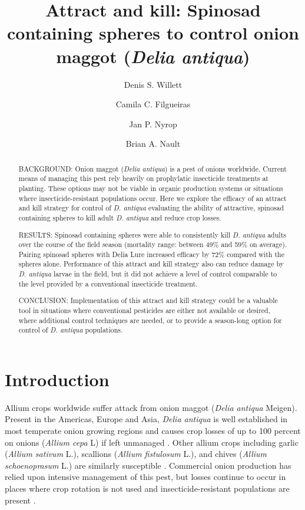 \documentclass[alpha-refs]{wiley-article}
\title{Attract and kill: Spinosad containing spheres to control onion maggot (\textit{Delia antiqua})}
\author[1\authfn{1}]{Denis S. Willett}
\author[1\authfn{1}]{Camila C. Filgueiras}
\author[1]{Jan P. Nyrop}
\author[1]{Brian A. Nault}
\affil[1]{Department of Entomology, Cornell AgriTech, Cornell University, Geneva, NY, 14456, USA}
\begin{document}
\maketitle

\begin{abstract}

BACKGROUND: Onion maggot (\textit{Delia antiqua}) is a pest of onions worldwide. Current means of managing this pest rely heavily on prophylatic insecticide treatments at planting. These options may not be viable in organic production systems or situations where insecticide-resistant populations occur. Here we explore the efficacy of an attract and kill strategy for control of \textit{D. antiqua} evaluating the ability of attractive, spinosad containing spheres to kill adult \textit{D. antiqua} and reduce crop losses. 

RESULTS: Spinosad containing spheres were able to consistently kill \textit{D. antiqua} adults over the course of the field season (mortality range: between 49\% and 59\% on average). Pairing spinosad spheres with Delia Lure increased efficacy by 72\% compared with the spheres alone. Performance of this attract and kill strategy also can reduce damage by \textit{D. antiqua}  larvae in the field, but it did not achieve a level of control comparable to the level provided by a conventional insecticide treatment. 

CONCLUSION: Implementation of this attract and kill strategy could be a valuable tool in situations where conventional pesticides are either not available or desired, where additional control techniques are needed, or to provide a season-long option for control of \textit{D. antiqua} populations.

\end{abstract}

\linenumbers
\section{Introduction}

Allium crops worldwide suffer attack from onion maggot (\textit{Delia antiqua} Meigen).  Present in the Americas, Europe and Asia, \textit{Delia antiqua} is well established in most temperate onion growing regions and causes crop losses of up to 100 percent on onions (\textit{Allium cepa} L) if left unmanaged \citep{nault2006performance, nault2006onion}.  Other allium crops including garlic (\textit{Allium sativum} L.), scallions (\textit{Allium fistulosum} L.), and chives (\textit{Allium schoenoprasum} L.) are similarly susceptible \citep{ellis1979factors,ning2017predicting,nault2007ecology}.  Commercial onion production has relied upon intensive management of this pest, but losses continue to occur in places where crop rotation is not used and insecticide-resistant populations are present \citep{martinson1988dispersal, nault2006onion}.  
\end{document}
